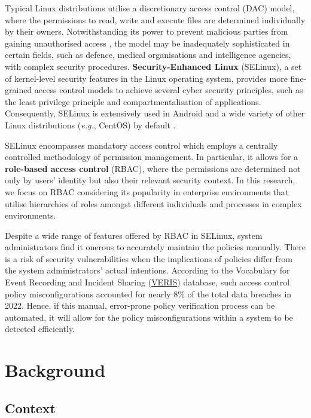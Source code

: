 \documentclass[acmsmall,screen,nonacm]{acmart}
\begin{document}
Typical Linux distributions utilise a discretionary access control (DAC) model, 
where the permissions to read, write and execute files are determined 
individually by their owners. Notwithstanding its power to prevent malicious 
parties from gaining unauthorised access \cite{dac-trojan}, the model may be 
inadequately sophisticated in certain fields, such as defence, medical 
organisations and intelligence agencies, with complex security procedures. 
\textbf{Security-Enhanced Linux} (SELinux), a set of kernel-level security 
features in the Linux operating system, provides more fine-grained access 
control models to achieve several cyber security principles, such as the least 
privilege principle and compartmentalisation of applications. Consequently, 
SELinux is extensively used in Android and a wide variety of other Linux 
distributions (\textit{e.g.}, CentOS) by default \cite{selinux-android}.

SELinux encompasses mandatory access control which employs a centrally 
controlled methodology of permission management. In particular, it allows for a 
\textbf{role-based access control} (RBAC), where the permissions are determined 
not only by users' identity but also their relevant security context. In this 
research, we focus on RBAC considering its popularity in enterprise 
environments that utilise hierarchies of roles amongst different individuals 
and processes in complex environments.

Despite a wide range of features offered by RBAC in SELinux, system 
administrators find it onerous to accurately maintain the policies manually. 
There is a risk of security vulnerabilities when the implications of policies 
differ from the system administrators' actual intentions. According to the 
Vocabulary for Event Recording and Incident Sharing 
(\href{https://verisframework.org/}{VERIS}) database, such access control 
policy misconfigurations accounted for nearly 8\% of the total data breaches in 
2022. Hence, if this manual, error-prone policy verification process can be 
automated, it will allow for the policy misconfigurations within a system to be 
detected efficiently.

\section{Background}

\subsection{Context}
\end{document}
